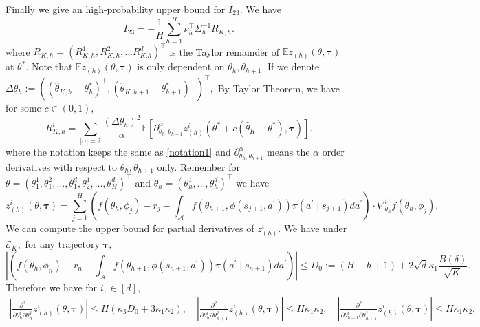 \documentclass{article}
\numberwithin{equation}{section}
\theoremstyle{plain}
\theoremstyle{definition}
\theoremstyle{remark}
\begin{document}
Finally we give an high-probability upper bound for $I_{23}.$ We have
\begin{equation*}
    I_{23} = -\frac{1}{H} \sum_{h=1}^H \nu_h^{\top} \Sigma_{h}^{-1} R_{K, h}.
\end{equation*}
where $R_{K,h} = (R_{K,h}^1,R_{K,h}^2,...R_{K.h}^d)^{\top}$ is the Taylor remainder of $\mathbb{E} z_{(h)}(\theta,\boldsymbol{\tau})$ at $\theta^*.$ Note that $\mathbb{E} z_{(h)}(\theta,\boldsymbol{\tau})$ is only dependent on $\theta_h,\theta_{h+1}.$ If we denote $\Delta \theta_h := ((\widehat{\theta}_{K,h} - \theta^*_h)^{\top}, (\widehat{\theta}_{K,h+1} - \theta^*_{h+1})^{\top})^{\top},$ By Taylor Theorem, we have for some $c \in (0,1),$
\begin{equation*}
    R_{K,h}^i = \sum_{\left|\alpha\right| = 2} \frac{\left(\Delta \theta_h\right)^2}{\alpha} \mathbb{E} \left[\partial^{\alpha}_{\theta_h,\theta_{h+1}} z_{(h)}^i\left(\theta^* + c\left(\widehat{\theta}_K - \theta^*\right),\boldsymbol{\tau}\right)\right].
\end{equation*}
where the notation keeps the same as \eqref{notation1} and $\partial^{\alpha}_{\theta_h,\theta_{h+1}}$ means the $\alpha$ order derivatives with respect to $\theta_h,\theta_{h+1}$ only. Remember for $\theta = (\theta_1^1,\theta_1^2,...,\theta_1^d,\theta_2^1,...,\theta_H^d)^{\top}$ and $\theta_h = (\theta_h^1,...,\theta_h^d)^{\top}$ we have
$$
z_{(h)}^i(\theta, \boldsymbol{\tau})=\sum_{j=1}^{H}\left(f\left(\theta_{h}, \phi_{j}\right)-r_{j}-\int_{\mathcal{A}} f\left(\theta_{h+1}, \phi\left(s_{j+1}, a^{\prime}\right)\right) \pi\left(a^{\prime} \mid s_{j+1}\right) d a^{\prime}\right) \cdot \nabla_{\theta_h}^i f\left(\theta_{h}, \phi_{j}\right).
$$
We can compute the upper bound for partial derivatives of $z_{(h)}^i.$ We have under $\mathcal{E}_K,$ for any trajectory $\boldsymbol{\tau},$
$$
\left|\left(f\left(\theta_{h}, \phi_{n}\right)-r_{n}- \int_{\mathcal{A}} f\left(\theta_{h+1}, \phi\left(s_{n+1}, a^{\prime}\right)\right) \pi\left(a^{\prime} \mid s_{n+1}\right) d a^{\prime}\right)\right| \leq D_0 := (H-h+1) + 2\sqrt{d}\kappa_1 \frac{B(\delta)}{\sqrt{K}}.
$$
Therefore we have for $i, \in [d],$
\begin{align*}
    \left|\frac{\partial^2}{\partial \theta_h^i \partial \theta_h^j} z_{(h)}^i\left(\theta,\boldsymbol{\tau}\right)\right| \leq H \left(\kappa_3 D_0 + 3\kappa_1 \kappa_2 \right), \quad
    \left|\frac{\partial^2}{\partial \theta_h^i \partial \theta_{h+1}^j} z_{(h)}^i\left(\theta,\boldsymbol{\tau}\right)\right| \leq H \kappa_1 \kappa_2,\quad
    \left|\frac{\partial^2}{\partial \theta_{h+1}^i \partial \theta_{h+1}^j} z_{(h)}^i\left(\theta,\boldsymbol{\tau}\right)\right| \leq H \kappa_1 \kappa_2,
\end{align*}
\end{document}
